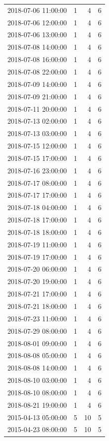 \begin{tabular}{lrrr}
2018-07-06 11:00:00 & 1 & 4 & 6 \\
2018-07-06 12:00:00 & 1 & 4 & 6 \\
2018-07-06 13:00:00 & 1 & 4 & 6 \\
2018-07-08 14:00:00 & 1 & 4 & 6 \\
2018-07-08 16:00:00 & 1 & 4 & 6 \\
2018-07-08 22:00:00 & 1 & 4 & 6 \\
2018-07-09 14:00:00 & 1 & 4 & 6 \\
2018-07-09 21:00:00 & 1 & 4 & 6 \\
2018-07-11 20:00:00 & 1 & 4 & 6 \\
2018-07-13 02:00:00 & 1 & 4 & 6 \\
2018-07-13 03:00:00 & 1 & 4 & 6 \\
2018-07-15 12:00:00 & 1 & 4 & 6 \\
2018-07-15 17:00:00 & 1 & 4 & 6 \\
2018-07-16 23:00:00 & 1 & 4 & 6 \\
2018-07-17 08:00:00 & 1 & 4 & 6 \\
2018-07-17 17:00:00 & 1 & 4 & 6 \\
2018-07-18 04:00:00 & 1 & 4 & 6 \\
2018-07-18 17:00:00 & 1 & 4 & 6 \\
2018-07-18 18:00:00 & 1 & 4 & 6 \\
2018-07-19 11:00:00 & 1 & 4 & 6 \\
2018-07-19 17:00:00 & 1 & 4 & 6 \\
2018-07-20 06:00:00 & 1 & 4 & 6 \\
2018-07-20 19:00:00 & 1 & 4 & 6 \\
2018-07-21 17:00:00 & 1 & 4 & 6 \\
2018-07-21 18:00:00 & 1 & 4 & 6 \\
2018-07-23 11:00:00 & 1 & 4 & 6 \\
2018-07-29 08:00:00 & 1 & 4 & 6 \\
2018-08-01 09:00:00 & 1 & 4 & 6 \\
2018-08-08 05:00:00 & 1 & 4 & 6 \\
2018-08-08 14:00:00 & 1 & 4 & 6 \\
2018-08-10 03:00:00 & 1 & 4 & 6 \\
2018-08-10 08:00:00 & 1 & 4 & 6 \\
2018-08-21 19:00:00 & 1 & 4 & 6 \\
2015-04-13 05:00:00 & 5 & 10 & 5 \\
2015-04-23 08:00:00 & 5 & 10 & 5 \\

\end{tabular}
